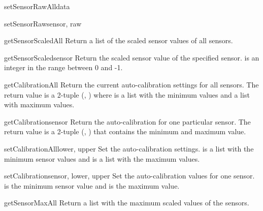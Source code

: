 \begin{methoddesc}{setSensorRawAll}{data}
\end{methoddesc}

\begin{methoddesc}{setSensorRaw}{sensor, raw}
\end{methoddesc}

\begin{methoddesc}{getSensorScaledAll}{}
Return a list of the scaled sensor values of all sensors.
\end{methoddesc}

\begin{methoddesc}{getSensorScaled}{sensor}
Return the scaled sensor value of the specified sensor.  is an
integer in the range between 0 and -1.
\end{methoddesc}

\begin{methoddesc}{getCalibrationAll}{}
Return the current auto-calibration settings for all sensors. The return
value is a 2-tuple (, ) where  is a list
with the minimum values and  a list with maximum values.
\end{methoddesc}

\begin{methoddesc}{getCalibration}{sensor}
Return the auto-calibration for one particular sensor. The return value
is a 2-tuple (, ) that contains the minimum and
maximum value.
\end{methoddesc}

\begin{methoddesc}{setCalibrationAll}{lower, upper}
Set the auto-calibration settings.  is a list with the minimum
sensor values and  is a list with the maximum values.
\end{methoddesc}

\begin{methoddesc}{setCalibration}{sensor, lower, upper}
Set the auto-calibration values for one sensor.  is the minimum
sensor value and  is the maximum value.
\end{methoddesc}

\begin{methoddesc}{getSensorMaxAll}{}
Return a list with the maximum scaled values of the sensors.
\end{methoddesc}

